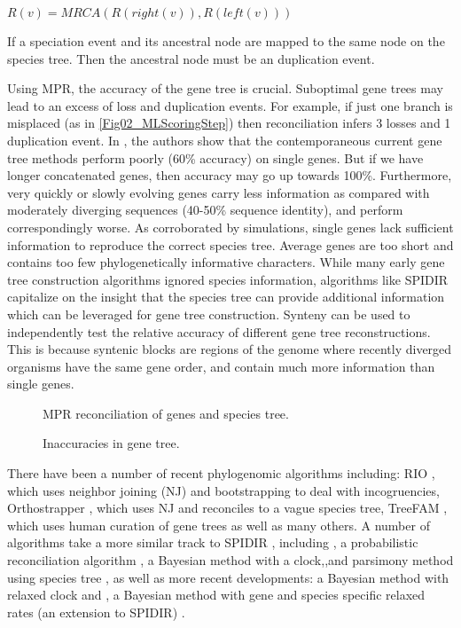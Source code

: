 $R(v) = MRCA(R(right(v)),R(left(v)))$

\noindent If a speciation event and its ancestral node are mapped to the same node on the species tree. Then the ancestral node must be an duplication event.

Using MPR, the accuracy of the gene tree is crucial. Suboptimal gene
trees may lead to an excess of loss and duplication events. For
example, if just one branch is misplaced (as in
\ref{Fig02_MLScoringStep}) then reconciliation infers 3 losses and 1
duplication event. In \cite{Rasmussen}, the authors show that the
contemporaneous current gene tree methods perform poorly (60\%
accuracy) on single genes. But if we have longer concatenated genes,
then accuracy may go up towards 100\%. Furthermore, very quickly or
slowly evolving genes carry less information as compared with
moderately diverging sequences (40-50\% sequence identity), and
perform correspondingly worse. As corroborated by simulations, single
genes lack sufficient information to reproduce the correct species
tree. Average genes are too short and contains too few
phylogenetically informative characters. While many early gene tree
construction algorithms ignored species information, algorithms like
SPIDIR capitalize on the insight that the species tree can provide
additional information which can be leveraged for gene tree
construction. Synteny can be used to independently test the relative
accuracy of different gene tree reconstructions. This is because
syntenic blocks are regions of the genome where recently diverged
organisms have the same gene order, and contain much more information
than single genes.

\begin{figure} [ht!] 
  \centering 
  \caption{MPR reconciliation of genes and species tree.}
  \label{Fig18_AlternateReconciliations}
\end{figure} 

\begin{figure} [ht!] 
  \centering 
  \caption{Inaccuracies in gene tree.}
  \label{Fig19_GeneTreeInaccuracies}
\end{figure} 

There have been a number of recent phylogenomic algorithms including:
RIO \cite{Zmasek}, which uses neighbor joining (NJ) and bootstrapping
to deal with incogruencies, Orthostrapper \cite{Storm}, which uses NJ
and reconciles to a vague species tree, TreeFAM \cite{Li}, which uses
human curation of gene trees as well as many others. A number of
algorithms take a more similar track to SPIDIR \cite{Rasmussen},
including \cite{Arvestad}, a probabilistic reconciliation algorithm
\cite{Hollich}, a Bayesian method with a clock,\cite{Wapinski},and
parsimony method using species tree , as well as more recent
developments: \cite{Akerborg} a Bayesian method with relaxed clock and
\cite{Rasmussen2011}, a Bayesian method with gene and species specific
relaxed rates (an extension to SPIDIR) .

